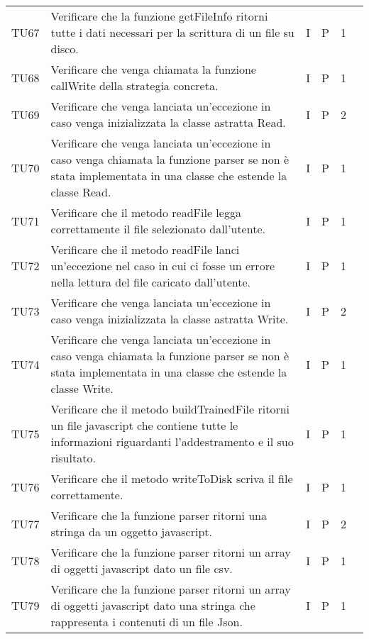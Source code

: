 \begin{longtable} {
		>{}p{12mm}
		>{}p{79.5mm}
		>{}p{9mm}
		>{}p{8mm}
		>{}p{14mm}
		>{}p{0mm}}
	TU67		& Verificare che la funzione getFileInfo ritorni tutte i dati necessari per la scrittura di un file su disco. & I & P & 1 & \TBstrut \\ [2mm]
	TU68		& Verificare che venga chiamata la funzione callWrite della strategia concreta. & I & P & 1 & \TBstrut \\ [2mm]
	TU69		& Verificare che venga lanciata un'eccezione in caso venga inizializzata la classe astratta Read. & I & P & 2 & \TBstrut \\ [2mm]
	TU70		& Verificare che venga lanciata un'eccezione in caso venga chiamata la funzione parser se non è stata implementata in una classe che estende la classe Read. & I & P & 1 & \TBstrut \\ [2mm]
	TU71		& Verificare che il metodo readFile legga correttamente il file selezionato dall'utente. & I & P & 1 & \TBstrut \\ [2mm]
	TU72		& Verificare che il metodo readFile lanci un'eccezione nel caso in cui ci fosse un errore nella lettura del file caricato dall'utente. & I & P & 1 & \TBstrut \\ [2mm]
	TU73		& Verificare che venga lanciata un'eccezione in caso venga inizializzata la classe astratta Write. & I & P & 2 & \TBstrut \\ [2mm]
	TU74		& Verificare che venga lanciata un'eccezione in caso venga chiamata la funzione parser se non è stata implementata in una classe che estende la classe Write. & I & P & 1 & \TBstrut \\ [2mm]
	TU75		& Verificare che il metodo buildTrainedFile ritorni un file javascript che contiene tutte le informazioni riguardanti l'addestramento e il suo risultato. & I & P & 1 & \TBstrut \\ [2mm]
	TU76		& Verificare che il metodo writeToDisk scriva il file correttamente. & I & P & 1 & \TBstrut \\ [2mm]
	TU77		& Verificare che la funzione parser ritorni una stringa da un oggetto javascript. & I & P & 2 & \TBstrut \\ [2mm]
	TU78		& Verificare che la funzione parser ritorni un array di oggetti javascript dato un file csv. & I & P & 1 & \TBstrut \\ [2mm]
	TU79		& Verificare che la funzione parser ritorni un array di oggetti javascript dato una stringa che rappresenta i contenuti di un file Json. & I & P & 1 & \TBstrut \\ [2mm]

\end{longtable}
